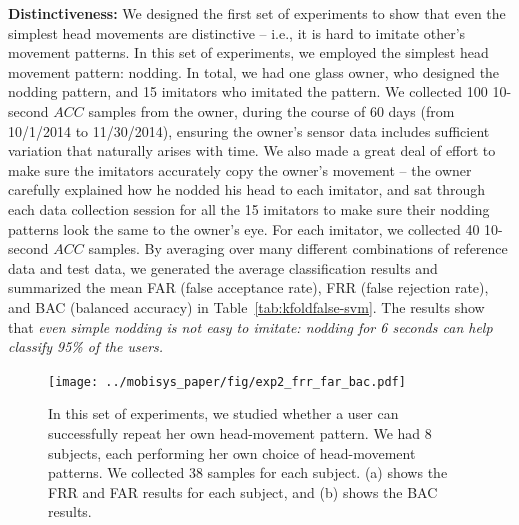 \vspace{4pt}\textbf{Distinctiveness:} We designed the first set of experiments to show that even the simplest head movements are distinctive -- i.e., it is hard to imitate other's movement patterns. In this set of experiments, we employed the simplest head movement pattern: nodding. In total, we had one glass owner, who designed the nodding pattern, and 15 imitators who imitated the pattern. We collected 100 10-second $ACC$ samples from the owner, during the course of 60 days (from 10/1/2014 to 11/30/2014), ensuring the owner's sensor data includes sufficient variation that naturally arises with time. We also made a great deal of effort to make sure the imitators accurately copy the owner's movement -- the owner carefully explained how he nodded his head to each imitator, and sat through each data collection session for all the 15 imitators to make sure their nodding patterns look the same to the owner's eye. For each imitator, we collected 40 10-second $ACC$ samples. By averaging over many different combinations of reference data and test data, we generated the average classification results and summarized the mean FAR (false acceptance rate), FRR (false rejection rate), and BAC (balanced accuracy) in Table~\ref{tab:kfoldfalse-svm}. The results show that \emph{even simple nodding is not easy to imitate: nodding for 6 seconds can help classify 95\% of the users.} %

\begin{figure}[t]
\centering
\texttt{[image: ../mobisys\_paper/fig/exp2\_frr\_far\_bac.pdf]}
\caption{In this set of experiments, we studied whether a user can successfully repeat her own head-movement pattern. We had 8 subjects, each performing her own choice of head-movement patterns. We collected 38 samples for each subject. (a) shows the FRR and FAR results for each subject, and (b) shows the BAC results.\label{fig:exp2_frr_far_bac}}
\end{figure}

